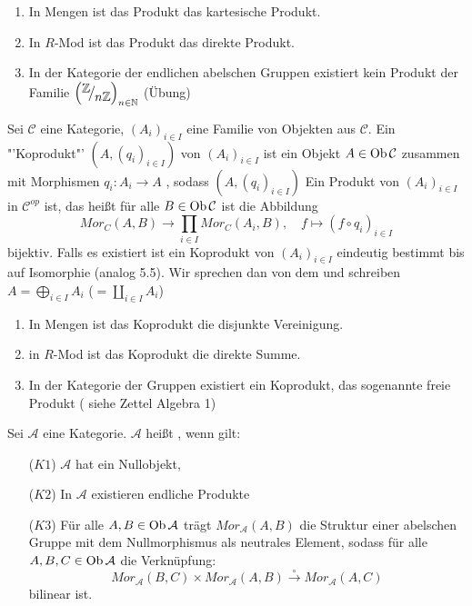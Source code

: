 \begin{bsp}
	\begin{enumerate} [label=\alph*)]
		\item In Mengen ist das Produkt das kartesische Produkt.
		\item In $R$-Mod ist das Produkt das direkte Produkt.
		\item In der Kategorie der endlichen abelschen Gruppen existiert kein Produkt der Familie $\left( \QR{\Z}{n\Z}\right)_{n \in \N}$ (Übung)
	\end{enumerate}
\end{bsp}
\begin{bem+df}\label{5.7}
	Sei $\mathcal{C} $ eine Kategorie, $ (A_i)_{i \in I}$ eine Familie von Objekten  aus $ \mathcal{C}$. Ein "'Koprodukt"' $(A, (q_i)_{i \in I})$ von $(A_i)_{i \in I}$ ist ein Objekt $ A \in \text{Ob}\,\mathcal{C} $ zusammen mit Morphismen $ q_i: A_i \to A$ , sodass $(A, (q_i)_{i \in I})$ Ein Produkt von $(A_i)_{i \in I } $ in $ \mathcal{C}^{op} $ ist, das heißt für alle $ B \in \text{Ob}\,\mathcal{C} $ ist die Abbildung $$ Mor_C(A,B) \to \prod_{i \in I} Mor_C(A_i,B) , \quad f \mapsto (f \circ q_i) _{i \in I} $$ bijektiv. Falls es existiert ist ein Koprodukt von $(A_i)_{i \in I }$ eindeutig bestimmt bis auf Isomorphie (analog 5.5). Wir sprechen dan von dem  und schreiben $ A = \bigoplus_{i \in I} A_i $ ($=\coprod_{i\in I} A_i$)
\end{bem+df}
\begin{bsp}
	\begin{enumerate} [label=\alph*)]
		\item In Mengen ist das Koprodukt die disjunkte Vereinigung.
		\item in $R$-Mod ist das Koprodukt die direkte Summe.
		\item In der Kategorie der Gruppen existiert ein Koprodukt, das sogenannte freie Produkt ( siehe Zettel Algebra 1)
	\end{enumerate}
\end{bsp}
\begin{df}\label{5.9}
	Sei $\mathcal{A} $ eine Kategorie. $\mathcal{A} $ heißt , wenn gilt:
	\begin{enumerate}
		\item[($K1$)] $\mathcal{A}$ hat ein Nullobjekt,
		\item[($K2$)] In $\mathcal{A}$ existieren endliche Produkte
		\item[($K3$)] Für alle $A,B \in \text{Ob}\,\mathcal{A}$ trägt $Mor_{\mathcal{A}}(A,B) $ die Struktur einer abelschen Gruppe mit dem Nullmorphismus als neutrales Element, sodass für alle $ A,B,C \in \text{Ob}\,\mathcal{A} $ die Verknüpfung:
		 $$ Mor_{\mathcal{A}}(B,C) \times  Mor_{\mathcal{A}}(A,B) \overset{\circ}{\longrightarrow}Mor_{\mathcal{A}}(A,C)$$ bilinear ist.
	\end{enumerate}
\end{df}
